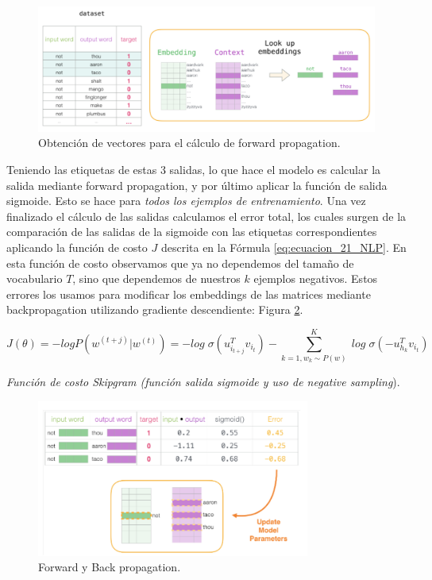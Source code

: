 \documentclass[12pt,a4paper]{article}
\begin{document}
\begin{sloppypar}
\begin{figure}[H]    
 \centering
 \includegraphics[width=1\textwidth]{images/NLP/28.png}
 \captionsetup{justification=centering,margin=3cm}
 \caption{Obtención de vectores para el cálculo de forward propagation\cite{datitos_nlp}.}
 \label{fig:Imagen_NLP_28}
\end{figure}

Teniendo las etiquetas de estas 3 salidas, lo que hace el modelo es calcular la salida mediante forward propagation, y por último aplicar la función de salida sigmoide. Esto se hace para \textit{todos los ejemplos de entrenamiento}. Una vez finalizado el cálculo de las salidas calculamos el error total, los cuales surgen de la comparación de las salidas de la sigmoide con las etiquetas correspondientes aplicando la función de costo $J$ descrita en la Fórmula \ref{eq:ecuacion_21_NLP}. En esta función de costo observamos que ya no dependemos del tamaño de vocabulario $T$, sino que dependemos de nuestros $k$ ejemplos negativos. Estos errores los usamos para modificar los embeddings de las matrices mediante backpropagation utilizando gradiente descendiente: Figura \ref{fig:Imagen_NLP_29}. 

\begin{equation}\label{eq:ecuacion_21_NLP}
J(\theta) = -log P(w^{(t+j)} | w^{(t)}) = - log \; \sigma (u_{i_{t+j}}^{T} v_{i_{t}}) - \sum_{k=1, w_k \sim P(w)}^{K} \;  log \; \sigma (-u_{h_{k}}^{T} v_{i_{t}})
\end{equation}
\begin{center}
\textit{Función de costo Skipgram (función salida sigmoide y uso de negative sampling})\cite{NLP_27}.
\end{center}

\begin{figure}[H]    
 \centering
 \includegraphics[width=0.8\textwidth]{images/NLP/29.png}
 \caption{Forward y Back propagation\cite{datitos_nlp}.}
 \label{fig:Imagen_NLP_29}
\end{figure}


\end{sloppypar}
\end{document}

